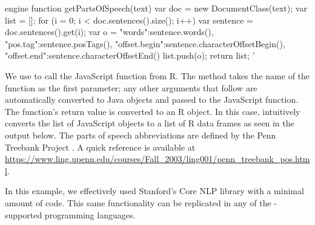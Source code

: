 \begin{example}
engine %
  function getPartsOfSpeech(text) {
    var doc = new DocumentClass(text);
    var list = [];
    for (i = 0; i < doc.sentences().size(); i++) {
      var sentence = doc.sentences().get(i);
      var o = {
        "words":sentence.words(),
        "pos.tag":sentence.posTags(),
        "offset.begin":sentence.characterOffsetBegin(),
        "offset.end":sentence.characterOffsetEnd()
      }
      list.push(o);
    }
    return list;
  }
'
\end{example}
We use  to call the JavaScript function  from R. The method  takes the name of the function as the first parameter; any other arguments that follow are automatically converted to Java objects and passed to the JavaScript function. The function's return value is converted to an R object. In this case,  intuitively converts the list of JavaScript objects to a list of R data frames as seen in the output below. The parts of speech abbreviations are defined by the Penn Treebank Project \citep{penntreebankproject}. A quick reference is available at \url{https://www.ling.upenn.edu/courses/Fall_2003/ling001/penn_treebank_pos.html}.


In this example, we effectively used Stanford's Core NLP library with a minimal amount of code. This same functionality can be replicated in any of the -supported programming languages.

